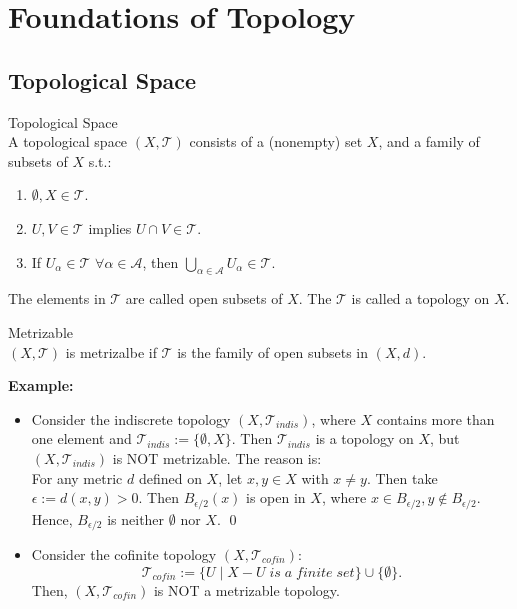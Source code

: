 \chapter{Foundations of Topology}

\section{Topological Space}
\begin{definition}{Topological Space}\\
A topological space $(X,\mathcal{T})$ consists of a (nonempty) set $X$, and a family of subsets of $X$ s.t.:
\begin{enumerate}
    \item $\emptyset, X \in \mathcal{T}$.
    \item $U,V \in \mathcal{T}$ implies $U\cap V \in \mathcal{T}$.
    \item If $U_\alpha \in \mathcal{T}$ $\forall \alpha \in \mathcal{A}$, then $\bigcup_{\alpha \in \mathcal{A}}U_\alpha \in \mathcal{T}$.
\end{enumerate}
The elements in $\mathcal{T}$ are called open subsets of $X$. The $\mathcal{T}$ is called a topology on $X$.
\end{definition}

\begin{definition}{Metrizable}\\
$(X,\mathcal{T})$ is metrizalbe if $\mathcal{T}$ is the family of open subsets in $(X,d)$.
\end{definition}

\noindent \textbf{Example:}
\begin{itemize}
    \item Consider the indiscrete topology $(X, \mathcal{T}_{indis})$, where $X$ contains more than one element and $\mathcal{T}_{indis}:= \{\emptyset , X\}$. Then $\mathcal{T}_{indis}$ is a topology on $X$, but $(X,\mathcal{T}_{indis})$ is NOT metrizable. The reason is: \\
    For any metric $d$ defined on $X$, let $x,y \in X$ with $x\neq y$. Then take $\epsilon := d(x,y) >0$. Then $B_{\epsilon/2} (x)$ is open in $X$, where $x \in B_{\epsilon/2}, y \notin B_{\epsilon/2}$. Hence, $B_{\epsilon/2}$ is neither $\emptyset$ nor $X$. \qed
    \item Consider the cofinite topology $(X,\mathcal{T}_{cofin})$:
    $$\mathcal{T}_{cofin}:= \{U \mid X-U \; is \; a \; finite\; set\} \cup \{\emptyset\}.$$
    Then, $(X, \mathcal{T}_{cofin})$ is NOT a metrizable topology.
\end{itemize}

